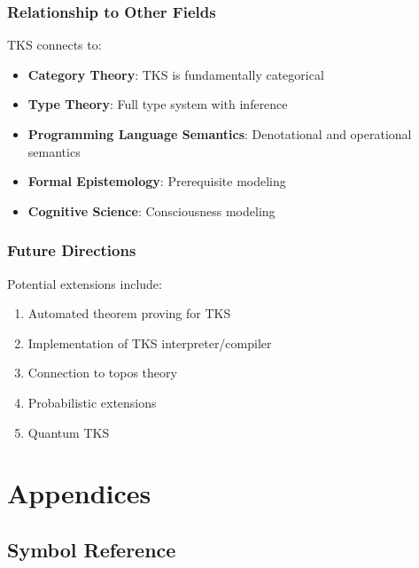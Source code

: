 \section{Relationship to Other Fields}

TKS connects to:
\begin{itemize}
  \item \textbf{Category Theory}: TKS is fundamentally categorical
  \item \textbf{Type Theory}: Full type system with inference
  \item \textbf{Programming Language Semantics}: Denotational and operational semantics
  \item \textbf{Formal Epistemology}: Prerequisite modeling
  \item \textbf{Cognitive Science}: Consciousness modeling
\end{itemize}

\section{Future Directions}

Potential extensions include:
\begin{enumerate}
  \item Automated theorem proving for TKS
  \item Implementation of TKS interpreter/compiler
  \item Connection to topos theory
  \item Probabilistic extensions
  \item Quantum TKS
\end{enumerate}

\appendix
\part{Appendices}

\chapter{Symbol Reference}
\label{app:symbols}

